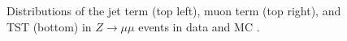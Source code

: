 \begin{centering}
\begin{figure}[!hbt]
\caption{ Distributions of the jet term (top left), muon term (top right), and \ac{TST} (bottom) \met in $Z\rightarrow\mu\mu$ events in data and \ac{MC} \cite{ATL-PHYS-PUB-2015-027}. }
\label{fig:reco_met_terms}
\end{figure}
\end{centering}




